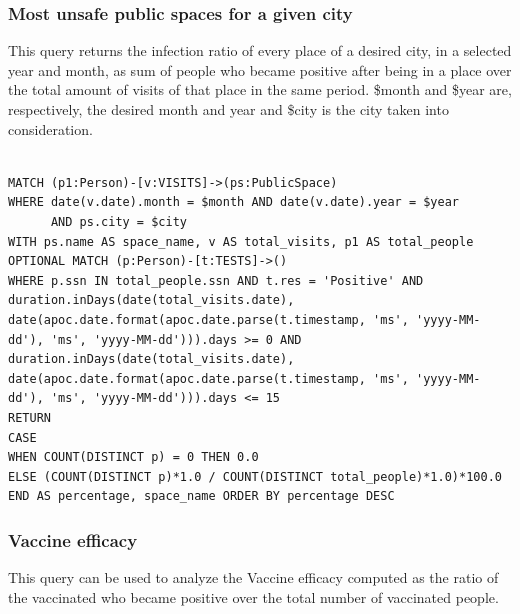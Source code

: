 \documentclass{article}
\begin{document}
\subsubsection{Most unsafe public spaces for a given city}
This query returns the infection ratio of every place of a desired city, in a selected year and month, as sum of people who became positive after being in a place over the total amount of visits of that place in the same period.
\$month and \$year are, respectively, the desired month and year and \$city is the city taken into consideration.
\begin{lstlisting}[language=cypher, label=lst:cypher-example]

MATCH (p1:Person)-[v:VISITS]->(ps:PublicSpace)
WHERE date(v.date).month = $month AND date(v.date).year = $year
      AND ps.city = $city
WITH ps.name AS space_name, v AS total_visits, p1 AS total_people
OPTIONAL MATCH (p:Person)-[t:TESTS]->()
WHERE p.ssn IN total_people.ssn AND t.res = 'Positive' AND duration.inDays(date(total_visits.date), date(apoc.date.format(apoc.date.parse(t.timestamp, 'ms', 'yyyy-MM-dd'), 'ms', 'yyyy-MM-dd'))).days >= 0 AND duration.inDays(date(total_visits.date), date(apoc.date.format(apoc.date.parse(t.timestamp, 'ms', 'yyyy-MM-dd'), 'ms', 'yyyy-MM-dd'))).days <= 15
RETURN
CASE
WHEN COUNT(DISTINCT p) = 0 THEN 0.0
ELSE (COUNT(DISTINCT p)*1.0 / COUNT(DISTINCT total_people)*1.0)*100.0
END AS percentage, space_name ORDER BY percentage DESC
\end{lstlisting}

\subsubsection{Vaccine efficacy}
This query can be used to analyze the Vaccine efficacy computed as the ratio of the vaccinated who became positive over the total number of vaccinated people.
\end{document}

